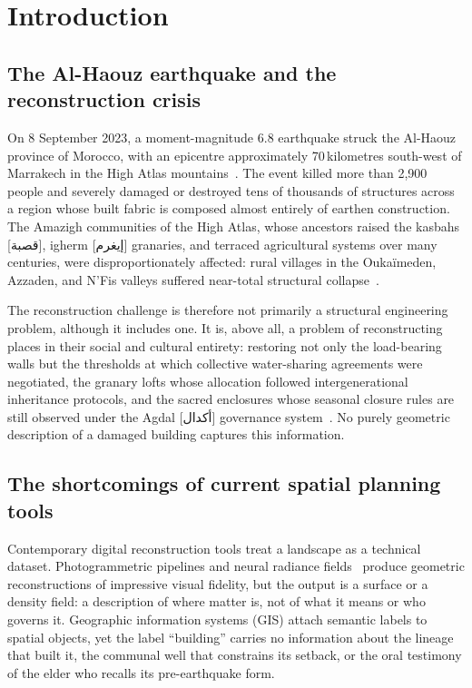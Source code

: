 \documentclass[11pt,a4paper]{article}
\theoremstyle{plain}
\theoremstyle{definition}
\theoremstyle{remark}
\newcommand{\textarabic}[1]{{\arabicfont #1}}
\begin{document}
\newpage

\section{Introduction}
\label{sec:intro}

\subsection{The Al-Haouz earthquake and the reconstruction crisis}

On 8 September 2023, a moment-magnitude 6.8 earthquake struck the
Al-Haouz province of Morocco, with an epicentre approximately
70\,kilometres south-west of Marrakech in the High Atlas
mountains~\cite{usgs2023morocco}. The event killed more than 2,900
people and severely damaged or destroyed tens of thousands of structures
across a region whose built fabric is composed almost entirely of earthen
construction. The Amazigh communities of the High Atlas, whose ancestors
raised the kasbahs [\textarabic{قصبة}], igherm [\textarabic{إيغرم}]
granaries, and terraced agricultural systems
over many centuries, were disproportionately affected: rural villages
in the Oukaïmeden, Azzaden, and N'Fis valleys suffered near-total
structural collapse~\cite{usgs2023morocco, unesco2023atlas}.

The reconstruction challenge is therefore not primarily a structural
engineering problem, although it includes one. It is, above all, a
problem of reconstructing places in their social and cultural entirety:
restoring not only the load-bearing walls but the thresholds at which
collective water-sharing agreements were negotiated, the granary lofts
whose allocation followed intergenerational inheritance protocols, and
the sacred enclosures whose seasonal closure rules are still observed
under the Agdal [\textarabic{أكدال}] governance system~\cite{auclair2011agdal,
dominguez2010relationships}. No purely geometric description of a
damaged building captures this information.

\subsection{The shortcomings of current spatial planning tools}

Contemporary digital reconstruction tools treat a landscape as a
technical dataset. Photogrammetric pipelines and neural radiance
fields~\cite{mildenhall2020nerf} produce geometric reconstructions of
impressive visual fidelity, but the output is a surface or a density
field: a description of where matter is, not of what it means or who
governs it. Geographic information systems (GIS) attach semantic labels
to spatial objects, yet the label ``building'' carries no information
about the lineage that built it, the communal well that constrains its
setback, or the oral testimony of the elder who recalls its pre-earthquake
form.
\end{document}
